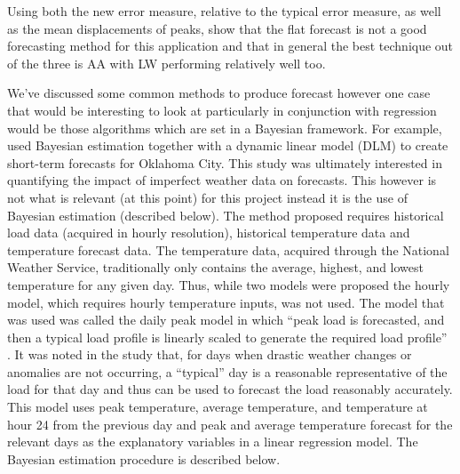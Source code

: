 Using both the new error measure, relative to the typical error measure, as well as the mean displacements of peaks, \cite{dan14} show that the flat forecast is not a good forecasting method for this application and that in general the best technique out of the three is AA with LW performing relatively well too.

We've discussed some common methods to produce forecast however one case that would be interesting to look at particularly in conjunction with regression would be those algorithms which are set in a Bayesian framework. For example,  \citet{douglas98} used Bayesian estimation together with a dynamic linear model (DLM) to create short-term forecasts for Oklahoma City. This study was ultimately interested in quantifying the impact of imperfect weather data on forecasts. This however is not what is relevant (at this point) for this project instead it is the use of Bayesian estimation (described below). The method proposed requires historical load data (acquired in hourly resolution), historical temperature data and temperature forecast data. The temperature data, acquired through the National Weather Service, traditionally only contains the average, highest, and lowest temperature for any given day. Thus, while two models were proposed the hourly model, which requires hourly temperature inputs, was not used. The model that was used was called the daily peak model in which ``peak load is forecasted, and then a typical load profile is linearly scaled to generate the required load profile'' \citep{douglas98}. It was noted in the study that, for days when drastic weather changes or anomalies are not occurring, a ``typical'' day is a reasonable representative of the load for that day and thus can be used to forecast the load reasonably accurately. This model uses peak temperature, average temperature, and temperature at hour 24 from the previous day and peak and average temperature forecast for the relevant days as the explanatory variables in a linear regression model. The Bayesian estimation procedure is described below.
